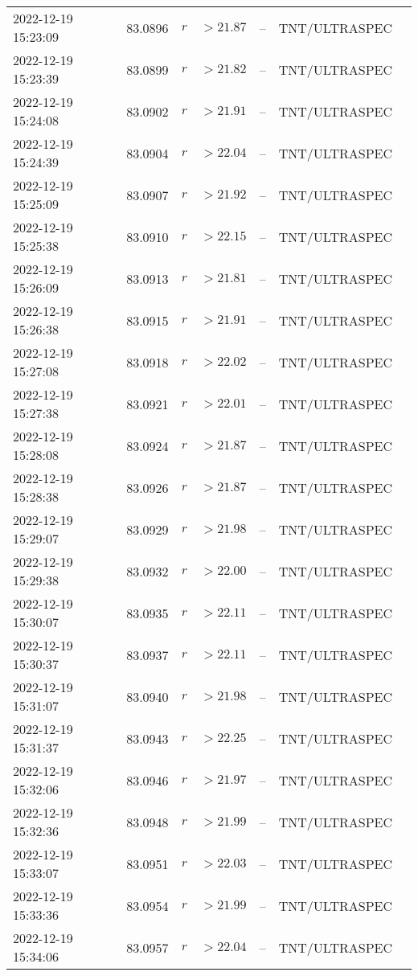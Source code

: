 \documentclass{nature_plusfigure}
\begin{document}
\begin{supplement}
\begin{center}
\begin{longtable}{lllllll}
2022-12-19 15:23:09 & 83.0896 & $r$ & $>21.87$ & -- & TNT/ULTRASPEC &  \\ 
2022-12-19 15:23:39 & 83.0899 & $r$ & $>21.82$ & -- & TNT/ULTRASPEC &  \\ 
2022-12-19 15:24:08 & 83.0902 & $r$ & $>21.91$ & -- & TNT/ULTRASPEC &  \\ 
2022-12-19 15:24:39 & 83.0904 & $r$ & $>22.04$ & -- & TNT/ULTRASPEC &  \\ 
2022-12-19 15:25:09 & 83.0907 & $r$ & $>21.92$ & -- & TNT/ULTRASPEC &  \\ 
2022-12-19 15:25:38 & 83.0910 & $r$ & $>22.15$ & -- & TNT/ULTRASPEC &  \\ 
2022-12-19 15:26:09 & 83.0913 & $r$ & $>21.81$ & -- & TNT/ULTRASPEC &  \\ 
2022-12-19 15:26:38 & 83.0915 & $r$ & $>21.91$ & -- & TNT/ULTRASPEC &  \\ 
2022-12-19 15:27:08 & 83.0918 & $r$ & $>22.02$ & -- & TNT/ULTRASPEC &  \\ 
2022-12-19 15:27:38 & 83.0921 & $r$ & $>22.01$ & -- & TNT/ULTRASPEC &  \\ 
2022-12-19 15:28:08 & 83.0924 & $r$ & $>21.87$ & -- & TNT/ULTRASPEC &  \\ 
2022-12-19 15:28:38 & 83.0926 & $r$ & $>21.87$ & -- & TNT/ULTRASPEC &  \\ 
2022-12-19 15:29:07 & 83.0929 & $r$ & $>21.98$ & -- & TNT/ULTRASPEC &  \\ 
2022-12-19 15:29:38 & 83.0932 & $r$ & $>22.00$ & -- & TNT/ULTRASPEC &  \\ 
2022-12-19 15:30:07 & 83.0935 & $r$ & $>22.11$ & -- & TNT/ULTRASPEC &  \\ 
2022-12-19 15:30:37 & 83.0937 & $r$ & $>22.11$ & -- & TNT/ULTRASPEC &  \\ 
2022-12-19 15:31:07 & 83.0940 & $r$ & $>21.98$ & -- & TNT/ULTRASPEC &  \\ 
2022-12-19 15:31:37 & 83.0943 & $r$ & $>22.25$ & -- & TNT/ULTRASPEC &  \\ 
2022-12-19 15:32:06 & 83.0946 & $r$ & $>21.97$ & -- & TNT/ULTRASPEC &  \\ 
2022-12-19 15:32:36 & 83.0948 & $r$ & $>21.99$ & -- & TNT/ULTRASPEC &  \\ 
2022-12-19 15:33:07 & 83.0951 & $r$ & $>22.03$ & -- & TNT/ULTRASPEC &  \\ 
2022-12-19 15:33:36 & 83.0954 & $r$ & $>21.99$ & -- & TNT/ULTRASPEC &  \\ 
2022-12-19 15:34:06 & 83.0957 & $r$ & $>22.04$ & -- & TNT/ULTRASPEC &  \\ 

\end{longtable}
\end{center}
\end{supplement}
\end{document}
